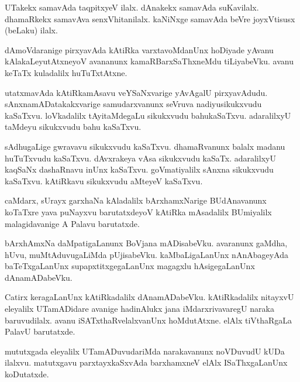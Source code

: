 \documentclass{article}
\begin{document}
\begin{mn}%
UTakekx samavAda taqpitxyeV ilalx. dAnakekx samavAda suKavilalx. dhamaRkekx samavAva 
senxVhitanilalx. kaNiNxge samavAda beVre joyxVtisusx (beLaku) ilalx.
\end{mn}

\begin{mn}%
dAmoVdaranige pirxyavAda kAtiRka varxtavoMdanUnx hoDiyade yAvanu kAlakaLeyutAtxneyoV avananunx 
kamaRBarxSaThxneMdu tiLiyabeVku. avanu keTaTx kuladalilx huTuTxtAtxne.
\end{mn}

\begin{mn}%
utatxmavAda kAtiRkamAsavu veYSaNxvarige yAvAgalU pirxyavAdudu. sAnxnamADatakakxvarige 
samudarxvanunx seVruva nadiyusikukxvudu kaSaTxvu. loVkadalilx tAyitaMdegaLu sikukxvudu 
bahukaSaTxvu. adaralilxyU taMdeyu sikukxvudu bahu kaSaTxvu.
\end{mn}

\begin{mn}%
sAdhugaLige gwravavu sikukxvudu kaSaTxvu. dhamaRvanunx balalx madanu huTuTxvudu kaSaTxvu. 
dAvxrakeya vAsa sikukxvudu kaSaTx. adaralilxyU kaqSaNx dashaRnavu inUnx kaSaTxvu. goVmatiyalilx 
sAnxna sikukxvudu kaSaTxvu. kAtiRkavu sikukxvudu aMteyeV kaSaTxvu.
\end{mn}

\begin{mn}%
caMdarx, sUrayx garxhaNa kAladalilx bArxhamxNarige BUdAnavanunx koTaTxre yava puNayxvu 
barutatxdeyoV kAtiRka mAsadalilx BUmiyalilx malagidavanige A Palavu barutatxde.
\end{mn}

\begin{mn}%
bArxhAmxNa daMpatigaLanunx BoVjana mADisabeVku. avaranunx gaMdha, hUvu, muMtAduvugaLiMda 
pUjisabeVku. kaMbaLigaLanUnx nAnAbageyAda baTeTxgaLanUnx supapxtitxgegaLanUnx magagxlu 
hAsigegaLanUnx dAnamADabeVku.
\end{mn}

\begin{mn}%
Catirx keragaLanUnx kAtiRkadalilx dAnamADabeVku. kAtiRkadalilx nitayxvU eleyalilx UTamADidare 
avanige hadinAlukx jana iMdarxrivavaregU naraka baruvudilalx. avanu iSATxthaRvelalxvanUnx 
hoMdutAtxne. elAlx tiVthaRgaLa PalavU barutatxde.
\end{mn}

\begin{mn}%
mututxgada eleyalilx UTamADuvudariMda narakavanunx noVDuvudU kUDa ilalxvu. matutxgavu 
parxtayxkaSxvAda barxhamxneV elAlx ISaThxgaLanUnx koDutatxde.
\end{mn}
\end{document}
